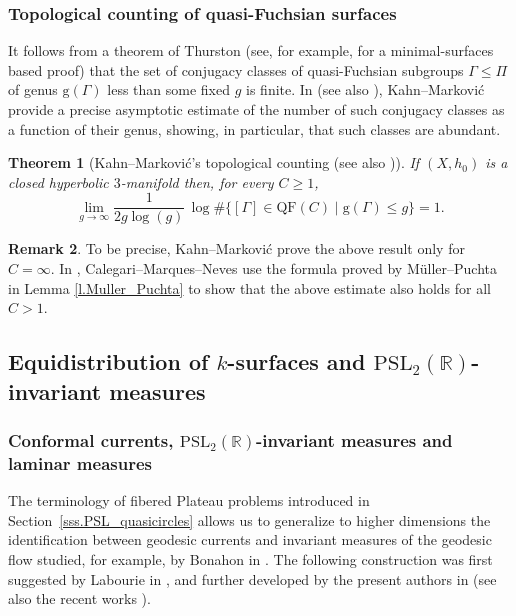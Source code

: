 \documentclass[10pt]{amsart}
\theoremstyle{plain}
\newtheorem{theorem}{Theorem}[section]
\theoremstyle{definition}
\newtheorem{remark}[theorem]{Remark}
\newcommand\PSL{\mathrm{PSL}_2(\mathbb{R})}
\let\Subsection\subsection\let\Subsubsection\subsubsection
\begin{document}
\subsubsection{Topological counting of quasi-Fuchsian surfaces} It follows from a theorem of Thurston (see, for example, \cite[Th.\,4.5]{LabourieBourbaki} for a minimal-surfaces based proof) that the set of conjugacy classes of quasi-Fuchsian subgroups $\Gamma\leq\Pi$ of genus $\text{g}(\Gamma)$ less than some fixed $g$ is finite. In \cite{KM2} (see also \cite{CMN}), Kahn--Markovi\'c provide a precise asymptotic estimate of the number of such conjugacy classes as a function of their genus, showing, in particular, that such classes are abundant.

\begin{theorem}[Kahn--Markovi\'c's topological counting \cite{KM2} (see also \cite{CMN})]\label{th.KM2}
If $(X,h_0)$ is a closed hyperbolic $3$\nobreakdash-manifold then, for every $C\geq 1$,
\begin{equation}\label{eq.topo_counting}\lim_{g\to\infty}\frac{1}{2g\log(g)}\,\log\#\{[\Gamma]\in\mathrm{QF}(C)\mid\mathrm{g}(\Gamma)\leq g\}=1.
\end{equation}
\end{theorem}

\begin{remark}To be precise, Kahn--Markovi\'c prove the above result only for $C=\infty$. In \cite[Th.\,4.2.]{CMN}, Calegari--Marques--Neves use the formula proved by Müller--Puchta in Lemma \ref{l.Muller_Puchta} to show that the above estimate also holds for all $C>1$.
\end{remark}

\Subsection{Equidistribution of $k$-surfaces and $\PSL$-invariant measures}

\Subsubsection{Conformal currents, $\PSL$-invariant measures and laminar measures}\label{sss.conf_currents_PSL_inv_laminar_measures} The terminology of fibered Plateau problems introduced in Section~\ref{sss.PSL_quasicircles} allows us to generalize to higher dimensions the identification between geodesic currents and invariant measures of the geodesic flow studied, for example, by Bonahon in \cite{Bonahon_laminations}. The following construction was first suggested by Labourie in \cite{LabourieBourbaki}, and further developed by the present authors in \cite{ALS} (see also the recent works \cite{Brody_Reyes,MN_currents}).
\end{document}
